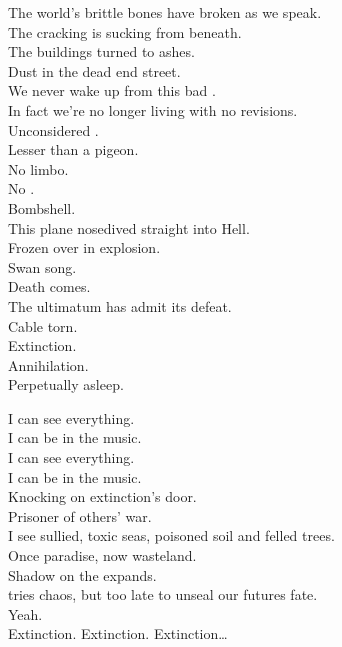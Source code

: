 The world's brittle bones have broken as we speak. \\
The cracking  is sucking from beneath. \\
The buildings turned to ashes. \\
Dust in the dead end street. \\
We never wake up from this bad . \\

In fact we're no longer living with no revisions. \\
Unconsidered . \\
Lesser than a pigeon. \\
No limbo. \\
No . \\
Bombshell. \\
This plane nosedived straight into Hell. \\
Frozen over in explosion. \\

Swan song. \\
Death comes. \\
The ultimatum has admit its defeat. \\
Cable torn. \\
Extinction. \\
Annihilation. \\
Perpetually asleep. \\



I can see everything. \\
I can be in the music. \\
I can see everything. \\
I can be in the music. \\

Knocking on extinction's door. \\
Prisoner of others' war. \\
I see sullied, toxic seas, poisoned soil and felled trees. \\
Once paradise, now wasteland. \\
Shadow on the  expands. \\
 tries chaos, but too late to unseal our futures fate. \\
Yeah. \\

Extinction. Extinction. Extinction… \\

